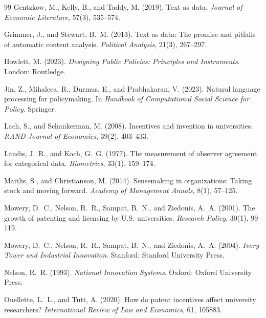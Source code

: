 \documentclass[12pt]{article}
\begin{document}
\begin{thebibliography}{99}
Gentzkow, M., Kelly, B., and Taddy, M. (2019).
\newblock Text as data.
\newblock \textit{Journal of Economic Literature}, 57(3), 535--574.

Grimmer, J., and Stewart, B.~M. (2013).
\newblock Text as data: The promise and pitfalls of automatic content analysis.
\newblock \textit{Political Analysis}, 21(3), 267--297.

Howlett, M. (2023).
\newblock \textit{Designing Public Policies: Principles and Instruments}.
\newblock London: Routledge.

Jin, Z., Mihalcea, R., Durmus, E., and Prabhakaran, V. (2023).
\newblock Natural language processing for policymaking.
\newblock In \textit{Handbook of Computational Social Science for Policy}.
  Springer.

Lach, S., and Schankerman, M. (2008).
\newblock Incentives and invention in universities.
\newblock \textit{RAND Journal of Economics}, 39(2), 403--433.

Landis, J.~R., and Koch, G.~G. (1977).
\newblock The measurement of observer agreement for categorical data.
\newblock \textit{Biometrics}, 33(1), 159--174.

Maitlis, S., and Christianson, M. (2014).
\newblock Sensemaking in organizations: Taking stock and moving forward.
\newblock \textit{Academy of Management Annals}, 8(1), 57--125.

Mowery, D.~C., Nelson, R.~R., Sampat, B.~N., and Ziedonis, A.~A. (2001).
\newblock The growth of patenting and licensing by U.S. universities.
\newblock \textit{Research Policy}, 30(1), 99--119.

Mowery, D.~C., Nelson, R.~R., Sampat, B.~N., and Ziedonis, A.~A. (2004).
\newblock \textit{Ivory Tower and Industrial Innovation}.
\newblock Stanford: Stanford University Press.

Nelson, R.~R. (1993).
\newblock \textit{National Innovation Systems}.
\newblock Oxford: Oxford University Press.

Ouellette, L.~L., and Tutt, A. (2020).
\newblock How do patent incentives affect university researchers?
\newblock \textit{International Review of Law and Economics}, 61, 105883.


\end{thebibliography}
\end{document}
